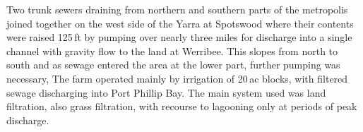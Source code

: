 Two trunk sewers draining from northern and southern parts of the
metropolis joined together on the west side of the Yarra at Spotswood
where their contents were raised 125\,ft by pumping over nearly three
miles for discharge into a single channel with gravity flow to the
land at Werribee.  This slopes from north to south and as sewage
entered the area at the lower part, further pumping was necessary, The
farm operated mainly by irrigation of 20\,ac blocks, with filtered
sewage discharging into Port Phillip Bay.  The main system used was
land filtration, also grass filtration, with recourse to lagooning
only at periods of peak discharge.


